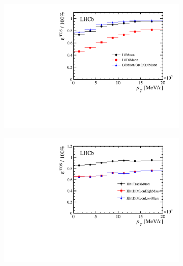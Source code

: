 \begin{figure}[t!]
  \centering
  \begin{subfigure}{0.5\textwidth}
    \raggedright
    \includegraphics[width=\textwidth,trim=0.45cm 0cm 0.4cm 0cm, clip=true]{Figures/Chapter2/l0_muon_eff}
    \caption{}
    \label{det_run_one_l0_muon_line_eff}
  \end{subfigure}%
  \hfill%
  \begin{subfigure}{0.5\textwidth}
    \raggedleft
    \includegraphics[width=\textwidth,trim=0.45cm 0cm 0.4cm 0cm, clip=true]{Figures/Chapter2/hlt1_muon_eff}
    \caption{}
    \label{det_run_one_hlt1_muon_line_eff}
  \end{subfigure}%
  \hfill%
  \begin{subfigure}{0.5\textwidth}
    \raggedright

\end{subfigure}
\end{figure}

